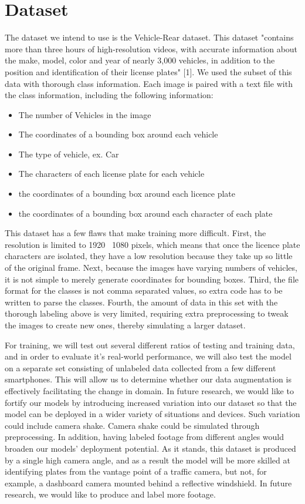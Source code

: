\documentclass[conference]{IEEEtran}
\begin{document}
\section{Dataset}
The dataset we intend to use is the Vehicle-Rear dataset. This dataset "contains more than three hours of high-resolution videos, with accurate information about the make, model, color and year of nearly 3,000 vehicles, in addition to the position and identification of their license plates" [1]. We used the subset of this data with thorough class information. Each image is paired with a text file with the class information, including the following information:
\begin{itemize}
\item The number of Vehicles in the image
\item The coordinates of a bounding box around each vehicle
\item The type of vehicle, ex. Car
\item The characters of each license plate for each vehicle
\item the coordinates of a bounding box around each licence plate
\item the coordinates of a bounding box around each character of each plate
\end{itemize}
\par
This dataset has a few flaws that make training more difficult. First, the resolution is limited to 1920 \texttimes\ 1080 pixels, which means that once the  licence plate characters are isolated, they have a low resolution because they take up so little of the original frame. Next, because the images have varying numbers of vehicles, it is not simple to merely generate coordinates for bounding boxes. Third, the file format for the classes is not comma separated values, so extra code has to be written to parse the classes. Fourth, the amount of data in this set with the thorough labeling above is very limited, requiring extra preprocessing  to tweak the images to create new ones, thereby simulating a larger dataset.
\par
For training, we will test out several different ratios of testing and training data, and in order to evaluate it's real-world performance, we will also test the model on a separate set consisting of unlabeled data collected from a few different smartphones. This will allow us to determine whether our data augmentation is effectively facilitating the change in domain. In future research, we would like to fortify our models by introducing increased variation into our dataset so that the model can be deployed in a wider variety of situations and devices. Such variation could include camera shake. Camera shake could be simulated through preprocessing. In addition, having labeled footage from different angles would broaden our models' deployment potential. As it stands, this dataset is produced by a single high camera angle, and as a result the model will be more skilled at identifying plates from the vantage point of a traffic camera, but not, for example, a dashboard camera mounted behind a reflective windshield. In future research, we would like to produce and label more footage.
\end{document}
